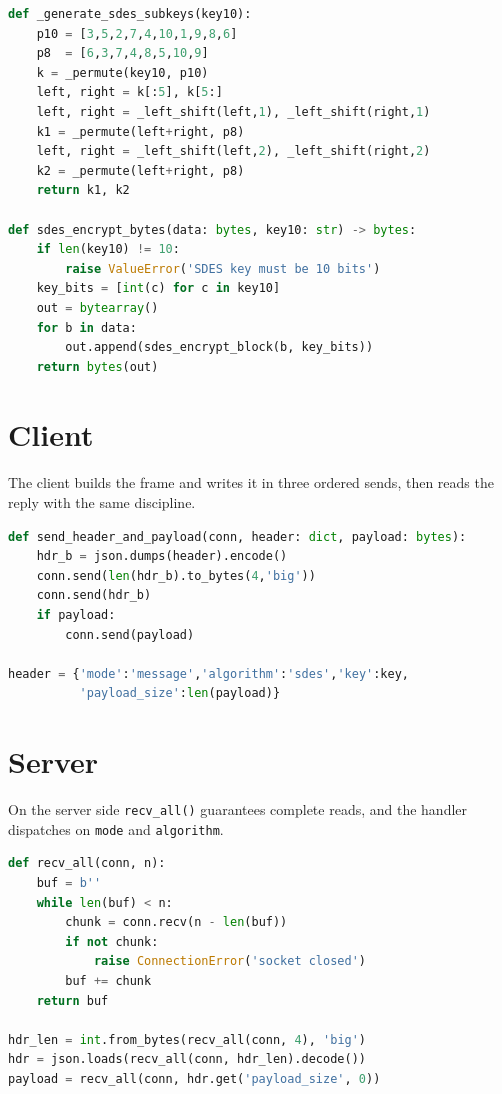 \begin{singlespace}
\begin{lstlisting}[language=Python, caption=S-DES key schedule and bulk encryption (\texttt{ciphers.py})]
def _generate_sdes_subkeys(key10):
    p10 = [3,5,2,7,4,10,1,9,8,6]
    p8  = [6,3,7,4,8,5,10,9]
    k = _permute(key10, p10)
    left, right = k[:5], k[5:]
    left, right = _left_shift(left,1), _left_shift(right,1)
    k1 = _permute(left+right, p8)
    left, right = _left_shift(left,2), _left_shift(right,2)
    k2 = _permute(left+right, p8)
    return k1, k2

def sdes_encrypt_bytes(data: bytes, key10: str) -> bytes:
    if len(key10) != 10:
        raise ValueError('SDES key must be 10 bits')
    key_bits = [int(c) for c in key10]
    out = bytearray()
    for b in data:
        out.append(sdes_encrypt_block(b, key_bits))
    return bytes(out)
\end{lstlisting}
\end{singlespace}

\section{Client}
The client builds the frame and writes it in three ordered sends, then reads the
reply with the same discipline.

\begin{singlespace}
\begin{lstlisting}[language=Python, caption=Framing and transmission on the client (\texttt{client.py})]
def send_header_and_payload(conn, header: dict, payload: bytes):
    hdr_b = json.dumps(header).encode()
    conn.send(len(hdr_b).to_bytes(4,'big'))
    conn.send(hdr_b)
    if payload:
        conn.send(payload)

header = {'mode':'message','algorithm':'sdes','key':key,
          'payload_size':len(payload)}
\end{lstlisting}
\end{singlespace}

\section{Server}
On the server side \texttt{recv\_all()} guarantees complete reads, and the
handler dispatches on \texttt{mode} and \texttt{algorithm}.

\begin{singlespace}
\begin{lstlisting}[language=Python, caption=Complete reads and frame parsing on the server (\texttt{server.py})]
def recv_all(conn, n):
    buf = b''
    while len(buf) < n:
        chunk = conn.recv(n - len(buf))
        if not chunk:
            raise ConnectionError('socket closed')
        buf += chunk
    return buf

hdr_len = int.from_bytes(recv_all(conn, 4), 'big')
hdr = json.loads(recv_all(conn, hdr_len).decode())
payload = recv_all(conn, hdr.get('payload_size', 0))
\end{lstlisting}
\end{singlespace}

